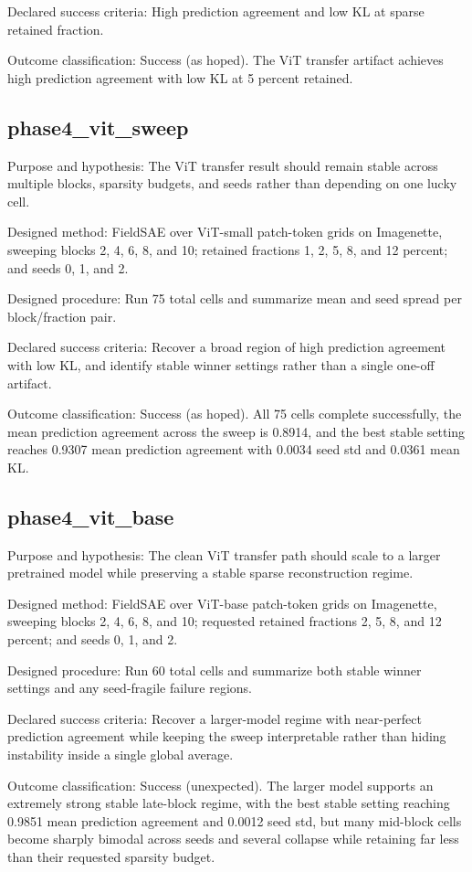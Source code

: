 \documentclass[11pt]{article}
\begin{document}
Declared success criteria: High prediction agreement and low KL at sparse retained fraction.


Outcome classification: Success (as hoped). The ViT transfer artifact achieves high prediction agreement with low KL at 5 percent retained.


\subsection{phase4\_vit\_sweep}
Purpose and hypothesis: The ViT transfer result should remain stable across multiple blocks, sparsity budgets, and seeds rather than depending on one lucky cell.


Designed method: FieldSAE over ViT-small patch-token grids on Imagenette, sweeping blocks 2, 4, 6, 8, and 10; retained fractions 1, 2, 5, 8, and 12 percent; and seeds 0, 1, and 2.


Designed procedure: Run 75 total cells and summarize mean and seed spread per block/fraction pair.


Declared success criteria: Recover a broad region of high prediction agreement with low KL, and identify stable winner settings rather than a single one-off artifact.


Outcome classification: Success (as hoped). All 75 cells complete successfully, the mean prediction agreement across the sweep is 0.8914, and the best stable setting reaches 0.9307 mean prediction agreement with 0.0034 seed std and 0.0361 mean KL.


\subsection{phase4\_vit\_base}
Purpose and hypothesis: The clean ViT transfer path should scale to a larger pretrained model while preserving a stable sparse reconstruction regime.


Designed method: FieldSAE over ViT-base patch-token grids on Imagenette, sweeping blocks 2, 4, 6, 8, and 10; requested retained fractions 2, 5, 8, and 12 percent; and seeds 0, 1, and 2.


Designed procedure: Run 60 total cells and summarize both stable winner settings and any seed-fragile failure regions.


Declared success criteria: Recover a larger-model regime with near-perfect prediction agreement while keeping the sweep interpretable rather than hiding instability inside a single global average.


Outcome classification: Success (unexpected). The larger model supports an extremely strong stable late-block regime, with the best stable setting reaching 0.9851 mean prediction agreement and 0.0012 seed std, but many mid-block cells become sharply bimodal across seeds and several collapse while retaining far less than their requested sparsity budget.
\end{document}
